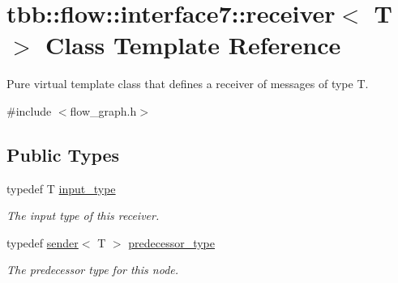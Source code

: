 \hypertarget{classtbb_1_1flow_1_1interface7_1_1receiver}{}\section{tbb\+:\+:flow\+:\+:interface7\+:\+:receiver$<$ T $>$ Class Template Reference}
\label{classtbb_1_1flow_1_1interface7_1_1receiver}


Pure virtual template class that defines a receiver of messages of type T.  




{\ttfamily \#include $<$flow\+\_\+graph.\+h$>$}

\subsection*{Public Types}
\begin{DoxyCompactItemize}
\item 
\hypertarget{classtbb_1_1flow_1_1interface7_1_1receiver_a16eccc851b858604344bb8f1bb9eedc8}{}typedef T \hyperlink{classtbb_1_1flow_1_1interface7_1_1receiver_a16eccc851b858604344bb8f1bb9eedc8}{input\+\_\+type}\label{classtbb_1_1flow_1_1interface7_1_1receiver_a16eccc851b858604344bb8f1bb9eedc8}

\begin{DoxyCompactList}\small\item\em The input type of this receiver. \end{DoxyCompactList}\item 
\hypertarget{classtbb_1_1flow_1_1interface7_1_1receiver_afbadf5511bd568d283040cd88bd4e81e}{}typedef \hyperlink{classtbb_1_1flow_1_1interface7_1_1sender}{sender}$<$ T $>$ \hyperlink{classtbb_1_1flow_1_1interface7_1_1receiver_afbadf5511bd568d283040cd88bd4e81e}{predecessor\+\_\+type}\label{classtbb_1_1flow_1_1interface7_1_1receiver_afbadf5511bd568d283040cd88bd4e81e}

\begin{DoxyCompactList}\small\item\em The predecessor type for this node. \end{DoxyCompactList}\end{DoxyCompactItemize}
